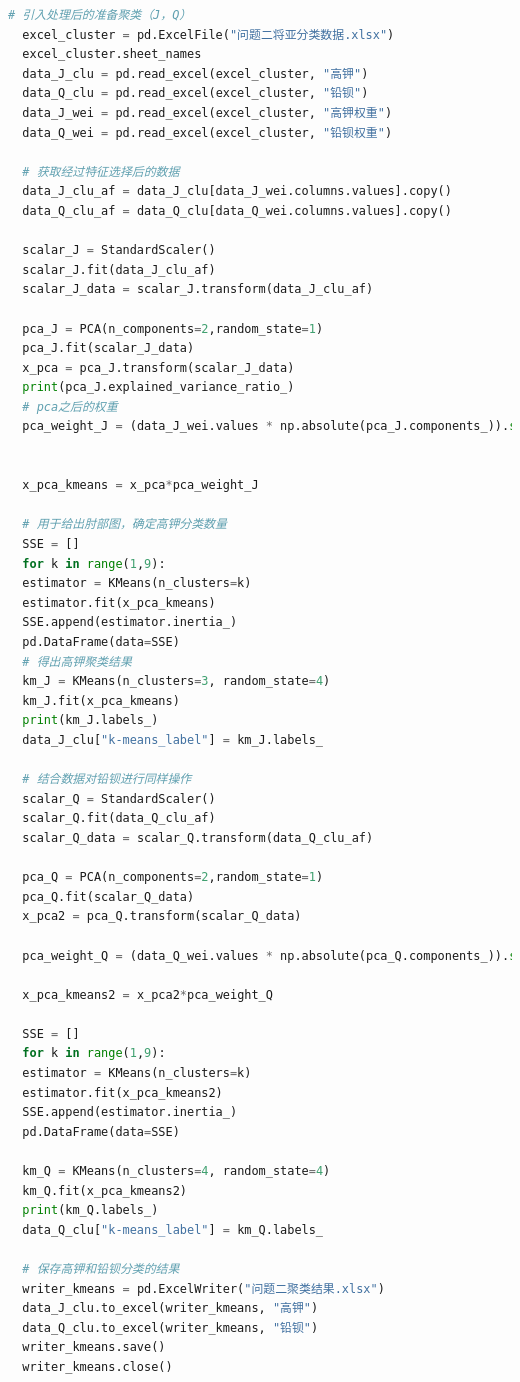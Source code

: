 \documentclass[withoutpreface,bwprint]{cumcmthesis} %
\begin{document}
\begin{appendices}
\begin{lstlisting}[language=python]
  # 引入处理后的准备聚类（J，Q）
  excel_cluster = pd.ExcelFile("问题二将亚分类数据.xlsx")
  excel_cluster.sheet_names
  data_J_clu = pd.read_excel(excel_cluster, "高钾")
  data_Q_clu = pd.read_excel(excel_cluster, "铅钡")
  data_J_wei = pd.read_excel(excel_cluster, "高钾权重")
  data_Q_wei = pd.read_excel(excel_cluster, "铅钡权重")
  
  # 获取经过特征选择后的数据
  data_J_clu_af = data_J_clu[data_J_wei.columns.values].copy()
  data_Q_clu_af = data_Q_clu[data_Q_wei.columns.values].copy()
  
  scalar_J = StandardScaler()
  scalar_J.fit(data_J_clu_af)
  scalar_J_data = scalar_J.transform(data_J_clu_af)
  
  pca_J = PCA(n_components=2,random_state=1)
  pca_J.fit(scalar_J_data)
  x_pca = pca_J.transform(scalar_J_data)
  print(pca_J.explained_variance_ratio_)
  # pca之后的权重
  pca_weight_J = (data_J_wei.values * np.absolute(pca_J.components_)).sum(axis=1)
  
  
  x_pca_kmeans = x_pca*pca_weight_J
  
  # 用于给出肘部图，确定高钾分类数量
  SSE = []
  for k in range(1,9):
  estimator = KMeans(n_clusters=k)
  estimator.fit(x_pca_kmeans)
  SSE.append(estimator.inertia_)
  pd.DataFrame(data=SSE)
  # 得出高钾聚类结果
  km_J = KMeans(n_clusters=3, random_state=4)
  km_J.fit(x_pca_kmeans)
  print(km_J.labels_)
  data_J_clu["k-means_label"] = km_J.labels_
  
  # 结合数据对铅钡进行同样操作
  scalar_Q = StandardScaler()
  scalar_Q.fit(data_Q_clu_af)
  scalar_Q_data = scalar_Q.transform(data_Q_clu_af)
  
  pca_Q = PCA(n_components=2,random_state=1)
  pca_Q.fit(scalar_Q_data)
  x_pca2 = pca_Q.transform(scalar_Q_data)
  
  pca_weight_Q = (data_Q_wei.values * np.absolute(pca_Q.components_)).sum(axis=1)
  
  x_pca_kmeans2 = x_pca2*pca_weight_Q
  
  SSE = []
  for k in range(1,9):
  estimator = KMeans(n_clusters=k)
  estimator.fit(x_pca_kmeans2)
  SSE.append(estimator.inertia_)
  pd.DataFrame(data=SSE)
  
  km_Q = KMeans(n_clusters=4, random_state=4)
  km_Q.fit(x_pca_kmeans2)
  print(km_Q.labels_)
  data_Q_clu["k-means_label"] = km_Q.labels_
  
  # 保存高钾和铅钡分类的结果
  writer_kmeans = pd.ExcelWriter("问题二聚类结果.xlsx")
  data_J_clu.to_excel(writer_kmeans, "高钾")
  data_Q_clu.to_excel(writer_kmeans, "铅钡")
  writer_kmeans.save()
  writer_kmeans.close()
  

\end{lstlisting}
\end{appendices}
\end{document}
